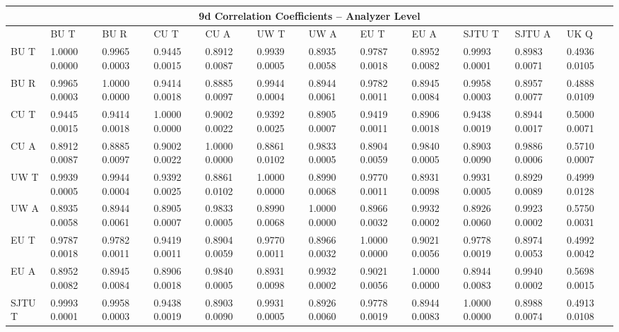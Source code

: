 

\begin{landscape}
\begin{table}
\small
\centering
\renewcommand{\arraystretch}{1.5}
\begin{tabularx}{1\linewidth}{@{\extracolsep{\fill}}lXXXXXXXXXXX}
  \toprule
  	\multicolumn{12}{c}{{\normalsize 9d Correlation Coefficients -- Analyzer Level}} \\
  \midrule
  	       & BU T & BU R & CU T & CU A & UW T & UW A & EU T & EU A & SJTU T & SJTU A & UK Q \\
  \midrule
	BU T   & 1.0000 0.0000 & 0.9965 0.0003 & 0.9445 0.0015 & 0.8912 0.0087 & 0.9939 0.0005 & 0.8935 0.0058 & 0.9787 0.0018 & 0.8952 0.0082 & 0.9993 0.0001 & 0.8983 0.0071 & 0.4936 0.0105  \\
	BU R   & 0.9965 0.0003 & 1.0000 0.0000 & 0.9414 0.0018 & 0.8885 0.0097 & 0.9944 0.0004 & 0.8944 0.0061 & 0.9782 0.0011 & 0.8945 0.0084 & 0.9958 0.0003 & 0.8957 0.0077 & 0.4888 0.0109  \\
	CU T   & 0.9445 0.0015 & 0.9414 0.0018 & 1.0000 0.0000 & 0.9002 0.0022 & 0.9392 0.0025 & 0.8905 0.0007 & 0.9419 0.0011 & 0.8906 0.0018 & 0.9438 0.0019 & 0.8944 0.0017 & 0.5000 0.0071  \\
	CU A   & 0.8912 0.0087 & 0.8885 0.0097 & 0.9002 0.0022 & 1.0000 0.0000 & 0.8861 0.0102 & 0.9833 0.0005 & 0.8904 0.0059 & 0.9840 0.0005 & 0.8903 0.0090 & 0.9886 0.0006 & 0.5710 0.0007  \\
	UW T   & 0.9939 0.0005 & 0.9944 0.0004 & 0.9392 0.0025 & 0.8861 0.0102 & 1.0000 0.0000 & 0.8990 0.0068 & 0.9770 0.0011 & 0.8931 0.0098 & 0.9931 0.0005 & 0.8929 0.0089 & 0.4999 0.0128  \\
	UW A   & 0.8935 0.0058 & 0.8944 0.0061 & 0.8905 0.0007 & 0.9833 0.0005 & 0.8990 0.0068 & 1.0000 0.0000 & 0.8966 0.0032 & 0.9932 0.0002 & 0.8926 0.0060 & 0.9923 0.0002 & 0.5750 0.0031  \\
	EU T   & 0.9787 0.0018 & 0.9782 0.0011 & 0.9419 0.0011 & 0.8904 0.0059 & 0.9770 0.0011 & 0.8966 0.0032 & 1.0000 0.0000 & 0.9021 0.0056 & 0.9778 0.0019 & 0.8974 0.0053 & 0.4992 0.0042  \\
	EU A   & 0.8952 0.0082 & 0.8945 0.0084 & 0.8906 0.0018 & 0.9840 0.0005 & 0.8931 0.0098 & 0.9932 0.0002 & 0.9021 0.0056 & 1.0000 0.0000 & 0.8944 0.0083 & 0.9940 0.0002 & 0.5698 0.0015  \\
	SJTU T & 0.9993 0.0001 & 0.9958 0.0003 & 0.9438 0.0019 & 0.8903 0.0090 & 0.9931 0.0005 & 0.8926 0.0060 & 0.9778 0.0019 & 0.8944 0.0083 & 1.0000 0.0000 & 0.8988 0.0074 & 0.4913 0.0108  \\

\end{tabularx}
\end{table}
\end{landscape}
